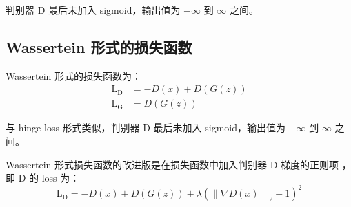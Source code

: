 判别器 D 最后未加入 sigmoid，输出值为 $-\infty$ 到 $\infty$ 之间。

\subsection{Wassertein 形式的损失函数}
Wassertein 形式的损失函数为：
\begin{align}
  \label{equ:WGAN-loss}
  \mathrm{L}_{\mathrm{D}} & = -D(x) + D(G(z)) \\
  \mathrm{L}_{\mathrm{G}} & = D(G(z))
\end{align}

与 hinge loss 形式类似，判别器 D 最后未加入 sigmoid，输出值为 $-\infty$ 到 $\infty$ 之间。

Wassertein 形式损失函数的改进版是在损失函数中加入判别器 D 梯度的正则项 ，
即 D 的 loss 为：
\begin{equation}
  \label{equ:WGAN-GP-loss}
  \mathrm{L}_{\mathrm{D}} = -D(x) + D(G(z)) + \lambda \left( \left\| \nabla D(x) \right\|_2 - 1 \right ) ^ 2
\end{equation}

